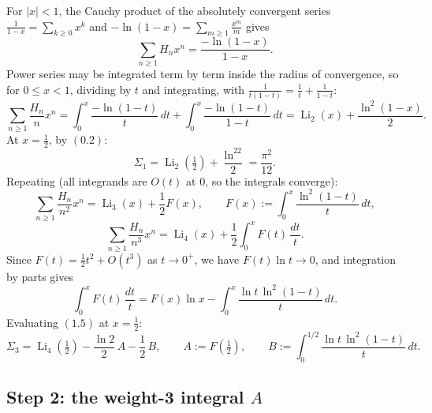 \documentclass[11pt]{article}
\theoremstyle{remark}
\begin{document}
For $|x|<1$, the Cauchy product of the absolutely convergent series $\frac1{1-x}=\sum_{k\ge0}x^k$ and $-\ln(1-x)=\sum_{m\ge1}\frac{x^m}{m}$ gives
\begin{equation}\sum_{n\ge1}H_nx^n=\frac{-\ln(1-x)}{1-x}. \tag{1.1}\end{equation}
Power series may be integrated term by term inside the radius of convergence, so for $0\le x<1$, dividing by $t$ and integrating, with $\frac1{t(1-t)}=\frac1t+\frac1{1-t}$:
\begin{equation}\sum_{n\ge1}\frac{H_n}{n}x^n=\int_0^x\frac{-\ln(1-t)}{t}\,dt+\int_0^x\frac{-\ln(1-t)}{1-t}\,dt
=\operatorname{Li}_2(x)+\frac{\ln^2(1-x)}{2}. \tag{1.2}\end{equation}
At $x=\tfrac12$, by $(0.2)$:
\begin{equation}\Sigma_1=\operatorname{Li}_2\!\left(\tfrac12\right)+\frac{\ln^22}{2}=\frac{\pi^2}{12}. \tag{1.3}\end{equation}
Repeating (all integrands are $O(t)$ at $0$, so the integrals converge):
\begin{equation}\sum_{n\ge1}\frac{H_n}{n^2}x^n=\operatorname{Li}_3(x)+\frac12F(x),\qquad F(x):=\int_0^x\frac{\ln^2(1-t)}{t}\,dt, \tag{1.4}\end{equation}
\begin{equation}\sum_{n\ge1}\frac{H_n}{n^3}x^n=\operatorname{Li}_4(x)+\frac12\int_0^xF(t)\,\frac{dt}{t}. \tag{1.5}\end{equation}
Since $F(t)=\tfrac12t^2+O(t^3)$ as $t\to0^+$, we have $F(t)\ln t\to0$, and integration by parts gives
$$\int_0^xF(t)\,\frac{dt}{t}=F(x)\ln x-\int_0^x\frac{\ln t\,\ln^2(1-t)}{t}\,dt .$$
Evaluating $(1.5)$ at $x=\tfrac12$:
\begin{equation}\Sigma_3=\operatorname{Li}_4\!\left(\tfrac12\right)-\frac{\ln2}{2}\,A-\frac12\,B,
\qquad A:=F\!\left(\tfrac12\right),\qquad B:=\int_0^{1/2}\frac{\ln t\,\ln^2(1-t)}{t}\,dt. \tag{1.6}\end{equation}

\subsection*{Step 2: the weight-3 integral $A$}
\end{document}
